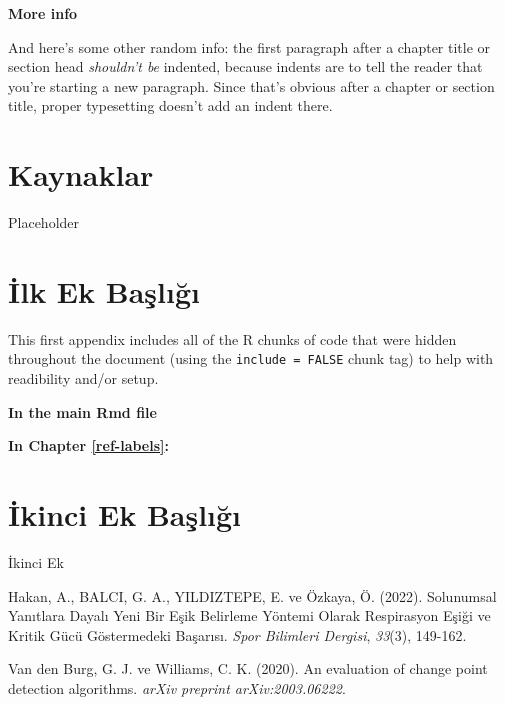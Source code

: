 \documentclass[12pt,twoside]{deuthesis}
\begin{document}
\textbf{More info}

And here's some other random info: the first paragraph after a chapter title or section head \emph{shouldn't be} indented, because indents are to tell the reader that you're starting a new paragraph. Since that's obvious after a chapter or section title, proper typesetting doesn't add an indent there.

\hypertarget{kaynaklar}{%
\chapter*{Kaynaklar}\label{kaynaklar}}

Placeholder

\appendix

\hypertarget{ilk-ek-baux15flux131ux11fux131}{%
\chapter{İlk Ek Başlığı}\label{ilk-ek-baux15flux131ux11fux131}}

This first appendix includes all of the R chunks of code that were hidden throughout the document (using the \texttt{include\ =\ FALSE} chunk tag) to help with readibility and/or setup.

\textbf{In the main Rmd file}

\textbf{In Chapter \ref{ref-labels}:}

\hypertarget{ikinci-ek-baux15flux131ux11fux131}{%
\chapter{İkinci Ek Başlığı}\label{ikinci-ek-baux15flux131ux11fux131}}

İkinci Ek

\hypertarget{refs}{}
\leavevmode\hypertarget{ref-hakan2022solunumsal}{}%
Hakan, A., BALCI, G. A., YILDIZTEPE, E. ve Özkaya, Ö. (2022). Solunumsal Yanıtlara Dayalı Yeni Bir Eşik Belirleme Yöntemi Olarak Respirasyon Eşiği ve Kritik Gücü Göstermedeki Başarısı. \emph{Spor Bilimleri Dergisi}, \emph{33}(3), 149-162.

\leavevmode\hypertarget{ref-van2020evaluation}{}%
Van den Burg, G. J. ve Williams, C. K. (2020). An evaluation of change point detection algorithms. \emph{arXiv preprint arXiv:2003.06222}.
\end{document}
